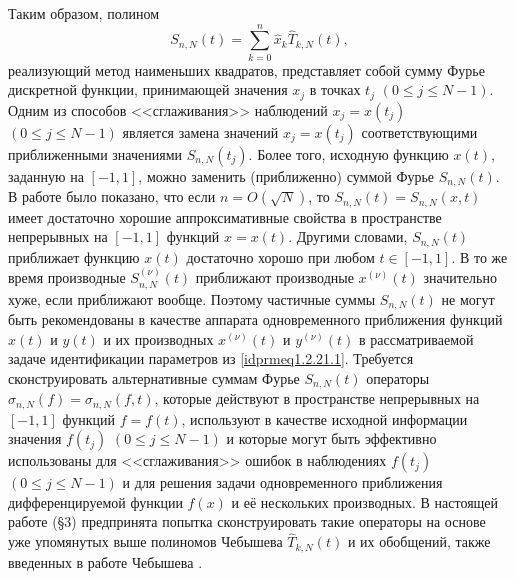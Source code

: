 Таким образом, полином
\begin{equation}\label{idprmeq1.2.21.5}
S_{n,N}(t)=\sum_{k=0}^n \hat x_k\hat T_{k,N}(t),
\end{equation}
реализующий метод наименьших квадратов, представляет собой сумму Фурье дискретной функции, принимающей значения $x_j$ в точках $t_j$ $(0\le j\le N-1)$. Одним из способов <<сглаживания>> наблюдений $x_j=x(t_j)$ $(0\le j\le N-1)$ является замена значений $x_j=x(t_j)$ соответствующими приближенными значениями $S_{n,N}(t_j)$. Более того, исходную функцию $x(t)$, заданную на $[-1,1]$, можно заменить (приближенно) суммой Фурье $S_{n,N}(t)$. В работе \cite{idprmmnk}  было показано, что если $n=O(\sqrt{N})$, то  $S_{n,N}(t)=S_{n,N}(x,t)$ имеет достаточно хорошие аппроксимативные свойства в пространстве непрерывных на $[-1,1]$ функций $x=x(t)$.  Другими словами, $S_{n,N}(t)$ приближает функцию $x(t)$
достаточно хорошо при любом $t\in[-1,1]$. В то же время производные $S^{(\nu)}_{n,N}(t)$ приближают производные $x^{(\nu)}(t)$ значительно хуже, если приближают  вообще. Поэтому частичные суммы  $S_{n,N}(t)$ не могут быть рекомендованы в качестве аппарата одновременного приближения функций $x(t)$  и $y(t)$ и их производных $x^{(\nu)}(t)$ и $y^{(\nu)}(t)$ в рассматриваемой задаче идентификации параметров из \eqref{idprmeq1.2.21.1}. Требуется сконструировать альтернативные суммам Фурье $S_{n,N}(t)$ операторы $\sigma_{n,N}(f)=\sigma_{n,N}(f,t)$, которые действуют в пространстве непрерывных на $[-1,1]$ функций $f=f(t)$, используют в качестве исходной информации значения  $f(t_j)$  $(0\le j\le N-1)$ и которые могут быть эффективно использованы для <<сглаживания>> ошибок в наблюдениях $f(t_j)$  $(0\le j\le N-1)$ и для  решения задачи одновременного приближения дифференцируемой функции $f(x)$ и её нескольких  производных. В настоящей работе (\S 3) предпринята попытка сконструировать такие операторы на основе уже упомянутых выше  полиномов Чебышева $\hat T_{k,N}(t)$ и их обобщений, также введенных в работе Чебышева \cite{idprm37}.

